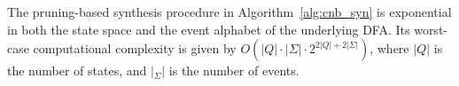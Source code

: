 \documentclass[final,5p,times,twocolumn,authoryear]{elsarticle}
\begin{document}
%
%

The pruning-based synthesis procedure in Algorithm~\ref{alg:cnb_syn} is exponential in both the state space and the event alphabet of the underlying DFA.
Its worst-case computational complexity is given by
$O(|Q|\cdot |\Sigma|\cdot 2^{2|Q|+2|\Sigma|})$, where $|Q|$ is the number of states, and $|_\Sigma|$ is the number of events.
\end{document}
